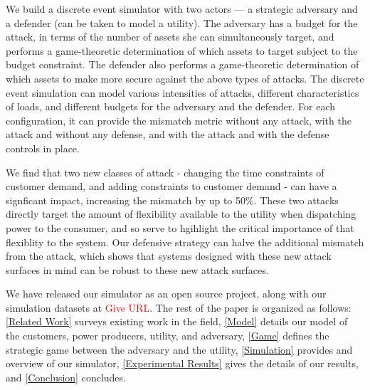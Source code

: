 \documentclass[conference]{IEEEtran}
\begin{document}
We build a discrete event simulator with two actors --- a strategic adversary and a defender (can be taken to model a utility). The adversary has a budget for the attack, in terms of the number of assets she can simultaneously target, and performs a game-theoretic determination of which assets to target subject to the budget constraint. The defender also performs a game-theoretic determination of which assets to make more secure against the above types of attacks. The discrete event simulation can model various intensities of attacks, different characteristics of loads, and different budgets for the adversary and the defender. For each configuration, it can provide the mismatch metric without any attack, with the attack and without any defense, and with the attack and with the defense controls in place. 

We find that two new classes of attack - changing the time constraints of customer demand, and adding constraints to customer demand - can have a signficant impact, increasing the mismatch by up to 50\%.  These two attacks directly target the amount of flexibility available to the utility when dispatching power to the consumer, and so serve to hgihlight the critical importance of that flexiblity to the system.  Our defensive strategy can halve the additional mismatch from the attack, which shows that systems designed with these new attack surfaces in mind can be robust to these new attack surfaces.  

We have released our simulator as an open source project, along with our simulation datasets at \textcolor{red}{Give URL}.  The rest of the paper is organized as follows: \ref{Related Work} surveys existing work in the field, \ref{Model} details our model of the customers, power producers, utility, and adversary, \ref{Game} defines the strategic game between the adversary and the utility, \ref{Simulation} provides and overview of our simulator, \ref{Experimental Results} gives the details of our results, and \ref{Conclusion} concludes.

\end{document}
